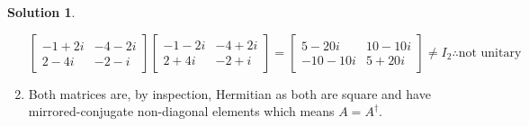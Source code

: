 \documentclass[10pt]{article}
\theoremstyle{definition}
\newtheorem{soln}{Solution}
\begin{document}
\begin{soln}
\begin{enumerate}[label=(\alph*)]
$$\begin{bmatrix}
              -1+2i & -4-2i \\
              2-4i  & -2-i
            \end{bmatrix}\begin{bmatrix}
              -1-2i & -4+2i \\
              2+4i  & -2+i
            \end{bmatrix}=
            \begin{bmatrix}
              5-20i   & 10-10i \\
              -10-10i & 5+20i
            \end{bmatrix}\neq I_2 \therefore \text{not unitary}
          $$
    \item Both matrices are, by inspection, Hermitian as both are square and have mirrored-conjugate non-diagonal elements which means $A=A^\dagger$.
  \end{enumerate}
\end{soln}
\end{document}
